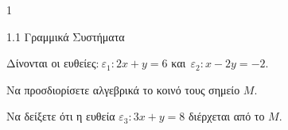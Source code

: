 \begin{ylh}{1}
\item 1.1 Γραμμικά Συστήματα
\end{ylh}
Δίνονται οι ευθείες:$\ \varepsilon_{1}:2x + y = 6$ και$\ {\ \varepsilon}_{2}:x - 2y = - 2$.
\begin{alist}
\item Να προσδιορίσετε αλγεβρικά το κοινό τους σημείο $M$.
\item Να δείξετε ότι η ευθεία $\varepsilon_{3}:3x + y = 8$ διέρχεται από το $M$.
\end{alist}

